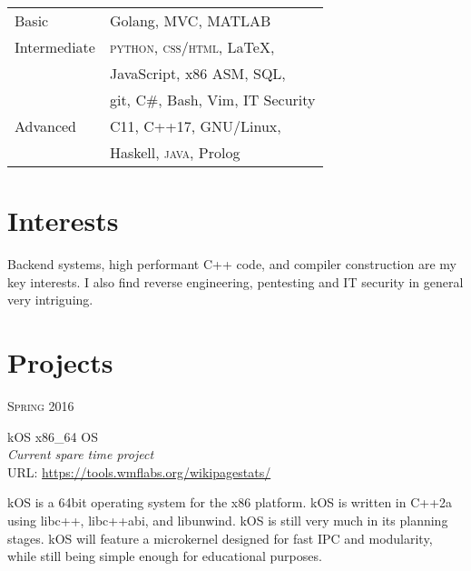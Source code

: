 \documentclass[11pt]{article} %
\begin{document}
{\begin{minipage}[t]{0.44\textwidth}
\begin{tabular}{ll}
Basic
    & Golang, MVC, MATLAB\\[4pt]
Intermediate
& \textsc{python}, \textsc{css/html}, \LaTeX,\\
& JavaScript, x86 ASM, SQL,\\
    & git, \textsc{C\#}, Bash, Vim, IT Security \\[4pt]
Advanced
& C11, C++17, GNU/Linux, \\
    & Haskell, \textsc{java}, Prolog \\[4pt]
\end{tabular}


\section{Interests} 

Backend systems, high performant C++ code, and compiler construction are my key
interests. I also find reverse engineering, pentesting and IT security in
general very intriguing.

\end{minipage} %
\clearpage

\begin{minipage}[t]{0.5\textwidth} %
\section{Projects}

{\raggedleft\textsc{Spring 2016}\par}

{\raggedright\large kOS x86\_64 OS\\ \textit{Current spare time project}  \\ \small URL:
    \href{https://tools.wmflabs.org/wikipagestats/}{https://tools.wmflabs.org/wikipagestats/} \\[5pt]}

    \normalsize{kOS is a 64bit operating system for the x86 platform. kOS is written in C++2a using libc++, libc++abi, and libunwind. kOS
        is still very much in its planning stages. kOS will feature a microkernel designed for fast IPC and modularity, while still being simple enough for educational purposes.}\\


\end{minipage}}
\end{document}

